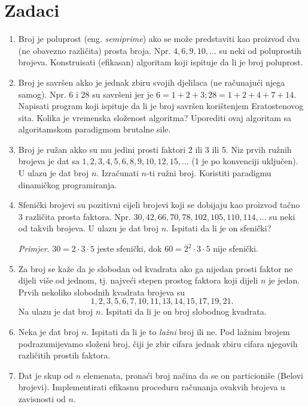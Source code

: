  
 \section{Zadaci}
 
 \begin{enumerate}
 	\item Broj je poluprost (eng. \textit{semiprime}) ako se može predstaviti
 	kao proizvod dva (ne obavezno različita) prosta broja. Npr. $4, 6, 9, 10, \ldots$ su neki od poluprostih brojeva. Konstruisati (efikasan) algoritam koji ispituje da li je broj poluprost.
 	\item Broj je savršen akko je jednak zbiru svojih djelilaca (ne računajući njega samog). Npr. 6 i 28 su savršeni jer je $6 = 1 + 2 + 3; 28 = 1 + 2 + 4 + 7 + 14$. Napisati program koji ispituje da li je broj savršen korištenjem Eratostenovog sita. Kolika je vremenska složenost algoritma? Uporediti ovaj algoritam sa algoritamskom paradigmom brutalne sile.
 	\item Broj je ružan akko su mu jedini prosti faktori 2 ili 3 ili 5. Niz prvih ružnih brojeva je dat sa $1, 2, 3, 4, 5, 6, 8, 9, 10, 12, 15, \ldots$ (1 je po
 	konvenciji uključen). U ulazu je  dat broj $n$. Izračunati $n$-ti ružni broj. Koristiti paradigmu dinamičkog programiranja.
 	\item Sfenički brojevi su pozitivni cijeli brojevi koji se dobijaju kao proizvod tačno 3 različita prosta faktora. Npr. $30, 42, 66, 70, 78, 102, 105, 110, 114, \ldots$ su neki od takvih brojeva. U ulazu je dat broj $n$. Ispitati da li je on sfenički? 
 	
 	\textit{Primjer}. $30=2 \cdot 3 \cdot 5$ jeste sfenički, dok $60 = 2^2 \cdot 3 \cdot 5 $ nije sfenički. 
 	\item Za broj se kaže da je slobodan od kvadrata ako ga nijedan
 	prosti faktor ne dijeli više od jednom, tj. najveći stepen prostog
 	faktora koji dijeli $n$  je jedan.  Prvih nekoliko slobodnih kvadrata brojeva su $$1, 2, 3, 5, 6, 7,
 	10, 11, 13, 14, 15, 17, 19, 21.$$   Na ulazu je dat broj $n$. Ispitati da li je on broj 	slobodnog kvadrata.
 	\item Neka je dat broj $n$. Ispitati da li je to \textit{lažni} broj ili ne.
 	Pod lažnim brojem podrazumijevamo složeni broj, čiji je zbir cifara jednak zbiru cifara njegovih različitih prostih faktora.%
 	
 	\item Dat je skup od $n$ elemenata, pronaći broj načina da se on particioniše (Belovi brojevi). Implementirati efikasnu proceduru računanja ovakvih brojeva u zavisnosti od $n$.  %
 \end{enumerate}
